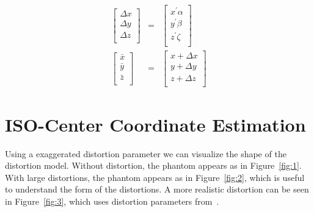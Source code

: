 \begin{eqnarray}
\begin{bmatrix}
  \Delta x \\
  \Delta y \\
  \Delta z \\
\end{bmatrix}
& = &
\begin{bmatrix}
x^\prime \alpha \\
y^\prime \beta \\
z^\prime \zeta \\
\end{bmatrix}
\label{eq2}
\\
\begin{bmatrix}
\bar{x} \\
\bar{y} \\
\bar{z} \\
\end{bmatrix}
& = &
\begin{bmatrix}
x + \Delta x \\
y + \Delta y \\
z + \Delta z \\
\end{bmatrix}
\label{eq3}
\end{eqnarray}

\section{ISO-Center Coordinate Estimation}

Using a exaggerated distortion parameter we can visualize the shape of the distortion model. Without distortion, the phantom appears as in Figure~\ref{fig:1}.  With large distortions, the phantom appears as in Figure~\ref{fig:2}, which is useful to understand the form of the distortions.  A more realistic distortion can be seen in Figure~\ref{fig:3}, which uses distortion parameters from~\cite{tlee_iaeng}.


